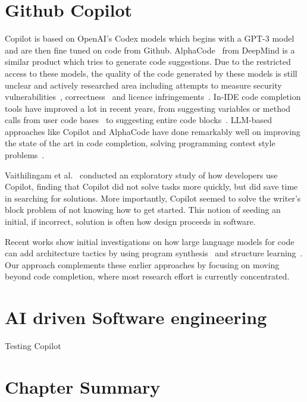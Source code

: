 \label{chapter:background}

\newlength{\savedunitlength}
\setlength{\unitlength}{2em}
\setlength{\unitlength}{\savedunitlength}

\section{Github Copilot}
Copilot is based on OpenAI's Codex models which begins with a GPT-3 model~\cite{Gpt3} and are then fine tuned on code from Github. AlphaCode~\cite{alphacode} from DeepMind is a similar product which tries to generate code suggestions. Due to the restricted access to these models, the quality of the code generated by these models is still unclear and actively researched area including attempts to measure security vulnerabilities~\cite{copilot_security}, correctness~\cite{empirical_eval} and licence infringements~\cite{code_clone}.
In-IDE code completion tools have improved a lot in recent years, from suggesting variables or method calls from user code bases~\cite{mandelin2005} to suggesting entire code blocks~\cite{Ciniselli2021}. 
LLM-based approaches like Copilot and AlphaCode have done remarkably well on improving the state of the art in code completion, solving programming contest style problems~\cite{empirical_eval}. %

Vaithilingam et al.~\cite{Vaithilingam2022} conducted an exploratory study of how developers use Copilot, finding that Copilot did not solve tasks more quickly, but did save time in searching for solutions. More importantly, Copilot seemed to solve the writer's block problem of not knowing how to get started. This notion of seeding an initial, if incorrect, solution is often how design proceeds in software. 

Recent works show initial investigations on how large language models for code can add architecture tactics by using program synthesis~\cite{Shokri2021} and structure learning~\cite{Karmakar2021}.
Our approach complements these earlier approaches by focusing on moving beyond code completion, where most research effort is currently concentrated.


\section{AI driven Software engineering}
Testing Copilot

\section{Chapter Summary}